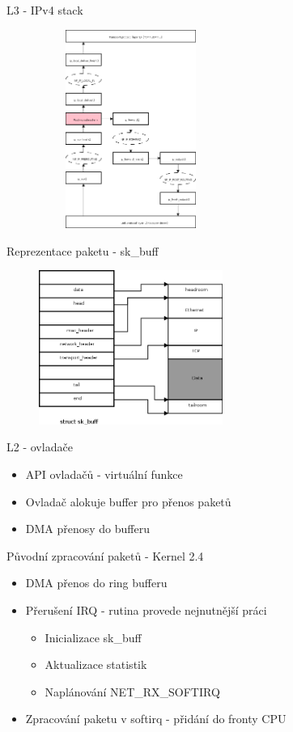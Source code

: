 \documentclass{beamer}
\begin{document}
\begin{frame}{L3 - IPv4 stack}
	\begin{figure}
		\centering
		\includegraphics[width=6cm,height=6.5cm]{fig/kernel-layer3-flow.png}
	\end{figure}
\end{frame}

\begin{frame}{Reprezentace paketu - sk\_buff}
	\begin{figure}
		\centering
		\includegraphics[width=6cm,keepaspectratio]{fig/skb.png}
	\end{figure}
\end{frame}


\begin{frame}{L2 - ovladače}
	\begin{itemize}
		\item API ovladačů - virtuální funkce
		\item Ovladač alokuje buffer pro přenos paketů
		\item DMA přenosy do bufferu
	\end{itemize}
\end{frame}

\begin{frame}{Původní zpracování paketů - Kernel 2.4}
	\begin{itemize}
		\item DMA přenos do ring bufferu
		\item Přerušení IRQ - rutina provede nejnutnější práci
		\begin{itemize}
			\item Inicializace sk\_buff
			\item Aktualizace statistik
			\item Naplánování NET\_RX\_SOFTIRQ
		\end{itemize}
		\item Zpracování paketu v softirq - přidání do fronty CPU
	\end{itemize}
\end{frame}
\end{document}
